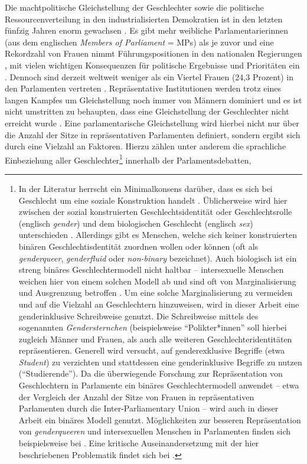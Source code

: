 \documentclass[12pt, 
    twoside=false, 
    bibliography=totoc, 
    numbers=endperiod, 
    headings=normal, 
    toc=chapterentrydotfill
    ]{scrbook}
\begin{document}
\noindent
Die machtpolitische Gleichstellung der Geschlechter sowie die politische Ressourcenverteilung in den industrialisierten Demokratien ist in den letzten fünfzig Jahren enorm gewachsen \parencite[318]{coffe_2010}. Es gibt mehr weibliche Parlamentarierinnen (aus dem englischen \emph{Members of Parliament} = MPs) als je zuvor und eine Rekordzahl von Frauen nimmt Führungspositionen in den nationalen Regierungen \parencites{lovenduski_2005}{paxton_2007}, mit vielen wichtigen Konsequenzen für politische Ergebnisse und Prioritäten ein \parencites{bolzendahl_2007}{carroll_2001}{waring_2000}[318]{coffe_2010}. Dennoch sind derzeit weltweit weniger als ein Viertel Frauen (24,3 Prozent) in den Parlamenten vertreten \parencite{ipu_2019}. Repräsentative Institutionen werden trotz eines langen Kampfes um Gleichstellung noch immer von Männern dominiert \parencites[149]{celis_2018}[497 f.]{childs_2013}{dahlerup_2013} {bjarnegard_2013} und es ist nicht umstritten zu behaupten, dass eine Gleichstellung der Geschlechter nicht erreicht wurde \parencite[150]{celis_2018}. Eine parlamentarische Gleichstellung wird hierbei nicht nur über die Anzahl der Sitze in repräsentativen Parlamenten definiert, sondern ergibt sich durch eine Vielzahl an Faktoren. Hierzu zählen unter anderem die sprachliche Einbeziehung aller Geschlechter\footnote{In der Literatur herrscht ein Minimalkonsens darüber, dass es sich bei Geschlecht um eine soziale Konstruktion handelt \parencite[2]{meissner_2008}. Üblicherweise wird hier zwischen der sozial konstruierten Geschlechtsidentität oder Geschlechtsrolle (englisch \emph{gender}) und dem biologischen Geschlecht (englisch \emph{sex}) unterschieden \parencite[3f.]{meissner_2008}. Allerdings gibt es Menschen, welche sich keiner konstruierten binären Geschlechtisdentität zuordnen wollen oder können (oft als \emph{genderqueer}, \emph{genderfluid} oder \emph{non-binary} bezeichnet). Auch biologisch ist ein streng binäres Geschlechtermodell nicht haltbar -- intersexuelle Menschen weichen hier von einem solchen Modell ab und sind oft von Marginalisierung und Ausgrenzung betroffen \parencite[vgl.][]{richards_2016}. Um eine solche Marginalisierung zu vermeiden und auf die Vielzahl an Geschlechtern hinzuweisen, wird in dieser Arbeit eine genderinklusive Schreibweise genutzt. Die Schreibweise mittels des sogenannten \emph{Gendersternchen} (beispielsweise \enquote{Polikter*innen} soll hierbei zugleich Männer und Frauen, als auch alle weiteren Geschlechteridentitäten repräsentieren. Generell wird versucht, auf genderexklusive Begriffe (etwa \emph{Student}) zu verzichten und stattdessen eine genderinklusive Begriffe zu nutzen (\enquote{Studierende}). Da die überwiegende Forschung zur Repräsentation von Geschlechtern in Parlamente ein binäres Geschlechtermodell anwendet -- etwa der Vergleich der Anzahl der Sitze von Frauen in repräsentativen Parlamenten durch die Inter-Parliamentary Union \textcite{ipu_2019} -- wird auch in dieser Arbeit ein binäres Modell genutzt. Möglichkeiten zur besseren Repräsentation von \emph{genderqueeren} und intersexuellen Menschen in Parlamenten finden sich beispielsweise bei \textcite{squires_2008}. Eine kritische Auseinandersetzung mit der hier beschriebenen Problematik findet sich bei \parencite[6ff.]{meissner_2008}.} innerhalb der Parlamentsdebatten, 
\end{document}
